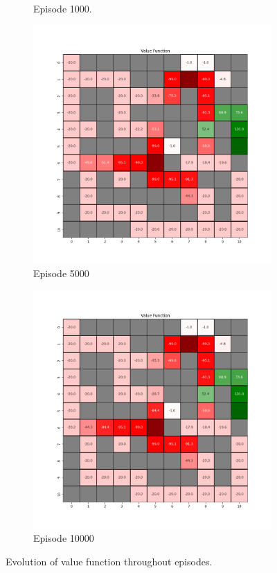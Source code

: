 \documentclass{assignment}
\begin{document}
\begin{figure}[H]
\begin{subfigure}{0.3\textwidth}
    \caption{Episode 1000.}
    \end{subfigure}\hfill
    \begin{subfigure}{0.3\textwidth}
        \includegraphics[width=\textwidth]{figures/value_td/alpha_sweep/value_function_alpha_1_gamma_0.95_epsilon_0.2_iteration_5000.png}
    \caption{Episode 5000}
    \end{subfigure}\hfill
    \begin{subfigure}{0.3\textwidth}
        \includegraphics[width=\textwidth]{figures/value_td/alpha_sweep/value_function_alpha_1_gamma_0.95_epsilon_0.2_iteration_10000.png}
    \caption{Episode 10000}
    \end{subfigure}
    \caption{Evolution of value function throughout episodes.}
    \label{fig:alpha_1_td_learning_value}
\end{figure}
\end{document}
